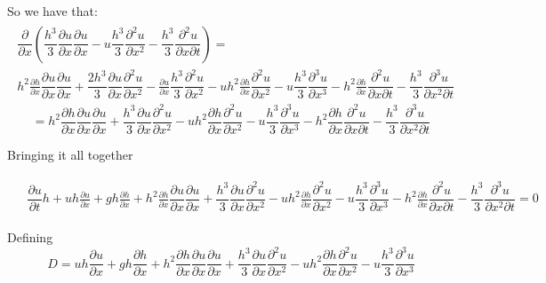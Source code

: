 \documentclass{article}
\begin{document}
So we have that:
\begin{gather*}
\begin{split}
\dfrac{\partial}{\partial x} \left(  \dfrac{h^3}{3} \dfrac{\partial u }{\partial x} \dfrac{\partial u}{\partial x} - u\dfrac{h^3}{3} \dfrac{\partial^2 u}{\partial x^2}  - \dfrac{h^3}{3}\dfrac{\partial^2 u}{\partial x \partial t} \right) = \\ h^2 \frac{\partial h}{\partial x} \dfrac{\partial u }{\partial x} \dfrac{\partial u}{\partial x} + \dfrac{2h^3}{3} \dfrac{\partial u }{\partial x} \dfrac{\partial^2 u}{\partial x^2} - \frac{\partial u}{\partial x}\dfrac{h^3}{3} \dfrac{\partial^2 u}{\partial x^2} - uh^2\frac{\partial h}{\partial x}\dfrac{\partial^2 u}{\partial x^2} - u\dfrac{h^3}{3}\dfrac{\partial^3 u}{\partial x^3} - h^2\frac{\partial h}{\partial x}\dfrac{\partial^2 u}{\partial x \partial t}   - \dfrac{h^3}{3}\dfrac{\partial^3 u}{\partial x^2 \partial t} 
\end{split}
\end{gather*}
\[=h^2 \frac{\partial h}{\partial x} \dfrac{\partial u }{\partial x} \dfrac{\partial u}{\partial x} + \dfrac{h^3}{3} \dfrac{\partial u }{\partial x} \dfrac{\partial^2 u}{\partial x^2} - uh^2\frac{\partial h}{\partial x}\dfrac{\partial^2 u}{\partial x^2} - u\dfrac{h^3}{3}\dfrac{\partial^3 u}{\partial x^3} - h^2\frac{\partial h}{\partial x}\dfrac{\partial^2 u}{\partial x \partial t}   - \dfrac{h^3}{3}\dfrac{\partial^3 u}{\partial x^2 \partial t}\]

Bringing it all together

\begin{gather*}
\begin{split}
&\dfrac{\partial u}{\partial t}h + uh\frac{\partial u}{\partial x} + gh\frac{\partial h}{\partial x} + h^2 \frac{\partial h}{\partial x} \dfrac{\partial u }{\partial x} \dfrac{\partial u}{\partial x} + \dfrac{h^3}{3} \dfrac{\partial u }{\partial x} \dfrac{\partial^2 u}{\partial x^2} - uh^2\frac{\partial h}{\partial x}\dfrac{\partial^2 u}{\partial x^2} - u\dfrac{h^3}{3}\dfrac{\partial^3 u}{\partial x^3} - h^2\frac{\partial h}{\partial x}\dfrac{\partial^2 u}{\partial x \partial t}   - \dfrac{h^3}{3}\dfrac{\partial^3 u}{\partial x^2 \partial t} = 0
\end{split}
\end{gather*}

Defining 
\[D = uh\frac{\partial u}{\partial x} + gh\frac{\partial h}{\partial x} + h^2 \frac{\partial h}{\partial x} \dfrac{\partial u }{\partial x} \dfrac{\partial u}{\partial x} + \dfrac{h^3}{3} \dfrac{\partial u }{\partial x} \dfrac{\partial^2 u}{\partial x^2} - uh^2\frac{\partial h}{\partial x}\dfrac{\partial^2 u}{\partial x^2} - u\dfrac{h^3}{3}\dfrac{\partial^3 u}{\partial x^3}\]
\end{document}

